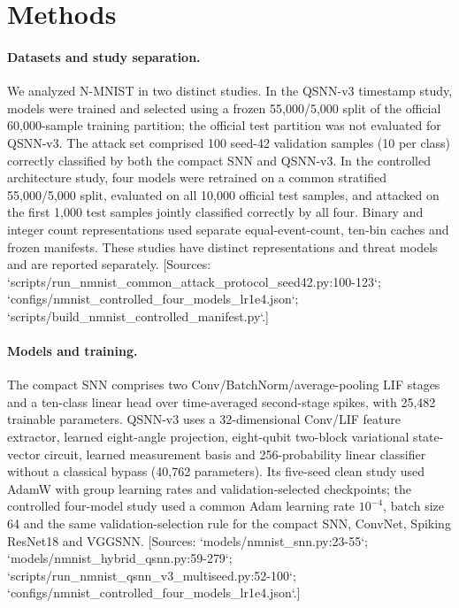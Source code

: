 \section{Methods}
\paragraph{Datasets and study separation.} We analyzed N-MNIST in two distinct studies. In the QSNN-v3 timestamp study, models were trained and selected using a frozen 55,000/5,000 split of the official 60,000-sample training partition; the official test partition was not evaluated for QSNN-v3. The attack set comprised 100 seed-42 validation samples (10 per class) correctly classified by both the compact SNN and QSNN-v3. In the controlled architecture study, four models were retrained on a common stratified 55,000/5,000 split, evaluated on all 10,000 official test samples, and attacked on the first 1,000 test samples jointly classified correctly by all four. Binary and integer count representations used separate equal-event-count, ten-bin caches and frozen manifests. These studies have distinct representations and threat models and are reported separately. [Sources: `scripts/run_nmnist_common_attack_protocol_seed42.py:100-123`; `configs/nmnist_controlled_four_models_lr1e4.json`; `scripts/build_nmnist_controlled_manifest.py`.]

\paragraph{Models and training.} The compact SNN comprises two Conv/BatchNorm/average-pooling LIF stages and a ten-class linear head over time-averaged second-stage spikes, with 25,482 trainable parameters. QSNN-v3 uses a 32-dimensional Conv/LIF feature extractor, learned eight-angle projection, eight-qubit two-block variational state-vector circuit, learned measurement basis and 256-probability linear classifier without a classical bypass (40,762 parameters). Its five-seed clean study used AdamW with group learning rates and validation-selected checkpoints; the controlled four-model study used a common Adam learning rate $10^{-4}$, batch size 64 and the same validation-selection rule for the compact SNN, ConvNet, Spiking ResNet18 and VGGSNN. [Sources: `models/nmnist_snn.py:23-55`; `models/nmnist_hybrid_qsnn.py:59-279`; `scripts/run_nmnist_qsnn_v3_multiseed.py:52-100`; `configs/nmnist_controlled_four_models_lr1e4.json`.]

